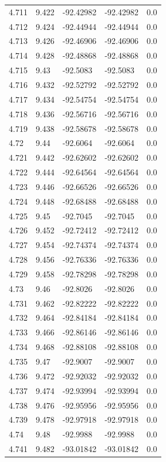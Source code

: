\begin{tabular}{lllll}
4.711 & 9.422 & -92.42982 & -92.42982 & 0.0 \\
4.712 & 9.424 & -92.44944 & -92.44944 & 0.0 \\
4.713 & 9.426 & -92.46906 & -92.46906 & 0.0 \\
4.714 & 9.428 & -92.48868 & -92.48868 & 0.0 \\
4.715 & 9.43 & -92.5083 & -92.5083 & 0.0 \\
4.716 & 9.432 & -92.52792 & -92.52792 & 0.0 \\
4.717 & 9.434 & -92.54754 & -92.54754 & 0.0 \\
4.718 & 9.436 & -92.56716 & -92.56716 & 0.0 \\
4.719 & 9.438 & -92.58678 & -92.58678 & 0.0 \\
4.72 & 9.44 & -92.6064 & -92.6064 & 0.0 \\
4.721 & 9.442 & -92.62602 & -92.62602 & 0.0 \\
4.722 & 9.444 & -92.64564 & -92.64564 & 0.0 \\
4.723 & 9.446 & -92.66526 & -92.66526 & 0.0 \\
4.724 & 9.448 & -92.68488 & -92.68488 & 0.0 \\
4.725 & 9.45 & -92.7045 & -92.7045 & 0.0 \\
4.726 & 9.452 & -92.72412 & -92.72412 & 0.0 \\
4.727 & 9.454 & -92.74374 & -92.74374 & 0.0 \\
4.728 & 9.456 & -92.76336 & -92.76336 & 0.0 \\
4.729 & 9.458 & -92.78298 & -92.78298 & 0.0 \\
4.73 & 9.46 & -92.8026 & -92.8026 & 0.0 \\
4.731 & 9.462 & -92.82222 & -92.82222 & 0.0 \\
4.732 & 9.464 & -92.84184 & -92.84184 & 0.0 \\
4.733 & 9.466 & -92.86146 & -92.86146 & 0.0 \\
4.734 & 9.468 & -92.88108 & -92.88108 & 0.0 \\
4.735 & 9.47 & -92.9007 & -92.9007 & 0.0 \\
4.736 & 9.472 & -92.92032 & -92.92032 & 0.0 \\
4.737 & 9.474 & -92.93994 & -92.93994 & 0.0 \\
4.738 & 9.476 & -92.95956 & -92.95956 & 0.0 \\
4.739 & 9.478 & -92.97918 & -92.97918 & 0.0 \\
4.74 & 9.48 & -92.9988 & -92.9988 & 0.0 \\
4.741 & 9.482 & -93.01842 & -93.01842 & 0.0 \\

\end{tabular}
